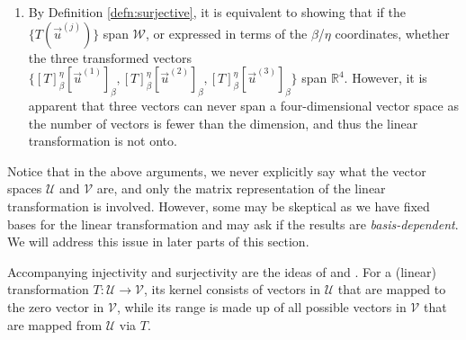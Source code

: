 \begin{solution}
\begin{enumerate}[label=(\alph*)]
\begin{align*}
    &\to 
    \left[\begin{array}{@{\,}wc{10pt}wc{10pt}wc{10pt}|wc{10pt}@{\,}}
    1 & -1 & 0 & 0 \\
    0 & 1 & 1 & 0\\
    0 & 0 & 1 & 0\\
    0 & 0 & -2 & 0
    \end{array}\right] & 
    -\frac{1}{2}R_3 \to R_3 \\
    &\to 
    \left[\begin{array}{@{\,}wc{10pt}wc{10pt}wc{10pt}|wc{10pt}@{\,}}
    1 & -1 & 0 & 0 \\
    0 & 1 & 1 & 0\\
    0 & 0 & 1 & 0\\
    0 & 0 & 0 & 0
    \end{array}\right] & 
    R_4 + 2R_3 \to R_4
    \end{align*}
    As every column in this homogeneous system contains a pivot, it demonstrates that $[T]_\beta^\eta[\vec{u}]_\beta = \textbf{0}$ indeed only has the trivial solution $[\vec{u}]_\beta = \textbf{0}$, and therefore the linear transformation in question is one-to-one.
    \item By Definition \ref{defn:surjective}, it is equivalent to showing that if the $\{T(\vec{u}^{(j)})\}$ span $\mathcal{W}$, or expressed in terms of the $\mathcal{\beta}$/$\mathcal{\eta}$ coordinates, whether the three transformed vectors $\{[T]_\beta^\eta[\vec{u}^{(1)}]_\beta, [T]_\beta^\eta[\vec{u}^{(2)}]_\beta, [T]_\beta^\eta[\vec{u}^{(3)}]_\beta\}$ span $\mathbb{R}^4$. However, it is apparent that three vectors can never span a four-dimensional vector space as the number of vectors is fewer than the dimension, and thus the linear transformation is not onto.
\end{enumerate}
Notice that in the above arguments, we never explicitly say what the vector spaces $\mathcal{U}$ and $\mathcal{V}$ are, and only the matrix representation of the linear transformation is involved. However, some may be skeptical as we have fixed bases for the linear transformation and may ask if the results are \textit{basis-dependent}. We will address this issue in later parts of this section.
\end{solution}
Accompanying injectivity and surjectivity are the ideas of  and . For a (linear) transformation $T: \mathcal{U} \to \mathcal{V}$, its kernel consists of vectors in $\mathcal{U}$ that are mapped to the zero vector in $\mathcal{V}$, while its range is made up of all possible vectors in $\mathcal{V}$ that are mapped from $\mathcal{U}$ via $T$.

